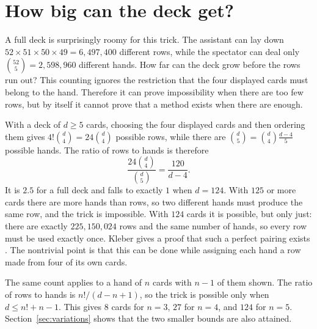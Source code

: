 \documentclass[11pt]{article}
\begin{document}
\section{How big can the deck get?}
\label{sec:ceiling}

A full deck is surprisingly roomy for this trick. The assistant can lay down $52 \times 51 \times 50 \times 49 = 6{,}497{,}400$ different rows, while the spectator can deal only $\binom{52}{5}=2{,}598{,}960$ different hands. How far can the deck grow before the rows run out? This counting ignores the restriction that the four displayed cards must belong to the hand. Therefore it can prove impossibility when there are too few rows, but by itself it cannot prove that a method exists when there are enough.

With a deck of $d\geq5$ cards, choosing the four displayed cards and then ordering them gives $4!\binom{d}{4}=24\binom{d}{4}$ possible rows, while there are $\binom{d}{5}=\binom{d}{4}\frac{d-4}{5}$ possible hands. The ratio of rows to hands is therefore
\[
  \frac{24\binom{d}{4}}{\binom{d}{5}}=\frac{120}{d-4}.
\]
It is $2.5$ for a full deck and falls to exactly $1$ when $d=124$. With $125$ or more cards there are more hands than rows, so two different hands must produce the same row, and the trick is impossible. With $124$ cards it is possible, but only just: there are exactly $225{,}150{,}024$ rows and the same number of hands, so every row must be used exactly once. Kleber gives a proof that such a perfect pairing exists \cite{Kleber}. The nontrivial point is that this can be done while assigning each hand a row made from four of its own cards.

The same count applies to a hand of $n$ cards with $n-1$ of them shown. The ratio of rows to hands is $n!/(d-n+1)$, so the trick is possible only when $d\leq n!+n-1$. This gives $8$ cards for $n=3$, $27$ for $n=4$, and $124$ for $n=5$. Section~\ref{sec:variations} shows that the two smaller bounds are also attained.
\end{document}
